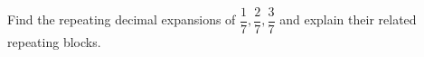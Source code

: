 Find the repeating decimal expansions of $\dfrac{1}{7},\dfrac{2}{7},\dfrac{3}{7}$ and explain their related repeating blocks.
